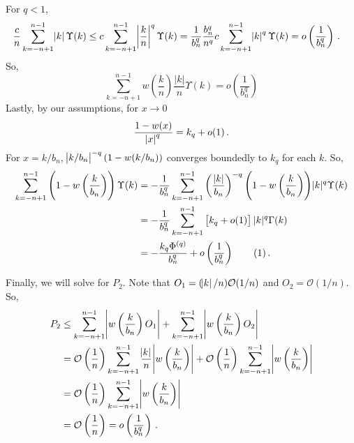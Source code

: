 \documentclass[11pt]{article}
\newcommand\numberthis{\addtocounter{equation}{1}\tag{\theequation}}
\theoremstyle{remark}
\begin{document}
For $q <1$,
\begin{align*}
   \dfrac{c}{n}\sum_{k = -n+1}^{n-1}\abs{k} \Upsilon(k)  &\leq c\sum_{k =-n+1}^{n-1}\abs{\dfrac{k}{n}}^q  \Upsilon(k)  = \dfrac{1}{b_n^q}\dfrac{b_n^q}{n^q} c \sum_{k =-n+1}^{n-1}\abs{k}^q \Upsilon(k)  = o\left(\dfrac{1}{b_n^q}\right) \, .
\end{align*}
So,
\begin{equation}
\label{eq:P1_second}
 \sum_{k = -n+1}^{n-1}w\left(\dfrac{k}{n}\right)\dfrac{|k|}{n}\Upsilon(k) = o \left(\dfrac{1}{b_n^q} \right)
\end{equation}
Lastly, by our assumptions, for $x \to 0$
\[
\dfrac{1 - w(x)}{\abs{x}^q} = k_q + o(1)\,.
\]
For $x = k/b_n$, $\abs{k/b_n}^{-q}(1-w(k/b_n))$ converges boundedly to $k_q$ for each $k$.
So,
\begin{align*}
     \sum_{k = -n+1}^{n-1}\left(1-w\left(\dfrac{k}{b_n}\right)\right)\Upsilon(k) &= -\dfrac{1}{b_n^q}\sum_{k = -n+1}^{n-1}  \left(\dfrac{|k|}{b_n}\right)^{-q} {\left(1-w\left(\dfrac{k}{b_n}\right)\right)}|k|^q \Upsilon(k) \\
     & = -\dfrac{1}{b_n^q}\sum_{k = -n+1}^{n-1}   \left[k_q + o(1) \right]|k|^q \Gamma(k) \\
     & = -\dfrac{k_q \Phi^{(q)} }{b_n^q} + o\left( \dfrac{1}{b_n^q} \right) \numberthis \label{eq:P1_third}\,.
\end{align*}

Finally, we will solve for $P_2$. Note that $O_1 = (\abs{k}/n)\mathcal{O}(1/n)$ and $O_2 = \mathcal{O}(1/n)$. So,
  \begin{align*}
    P_2  & \leq \sum_{k=-n+1}^{n-1}\abs{w\left(\dfrac{k}{b_n}\right)O_1} + \sum_{k=-n+1}^{n-1}\abs{w\left(\dfrac{k}{b_n}\right)O_2} \\
      &= \mathcal{O}\left(\dfrac{1}{n}\right)\sum_{k=-n+1}^{n-1}\dfrac{\abs{k}}{n}\abs{w\left(\dfrac{k}{b_n}\right)} + \mathcal{O}\left(\dfrac{1}{n}\right)\sum_{k=-n+1}^{n-1}\abs{w\left(\dfrac{k}{b_n}\right)}\\
      &= \mathcal{O}\left(\dfrac{1}{n}\right) \sum_{k=-n+1}^{n-1}\abs{w\left(\dfrac{k}{b_n}\right)}\\
      &= \mathcal{O}\left(\dfrac{1}{n}\right) = o\left(\dfrac{1}{b_n^q}\right) \,.
 \end{align*}
 
\end{document}
